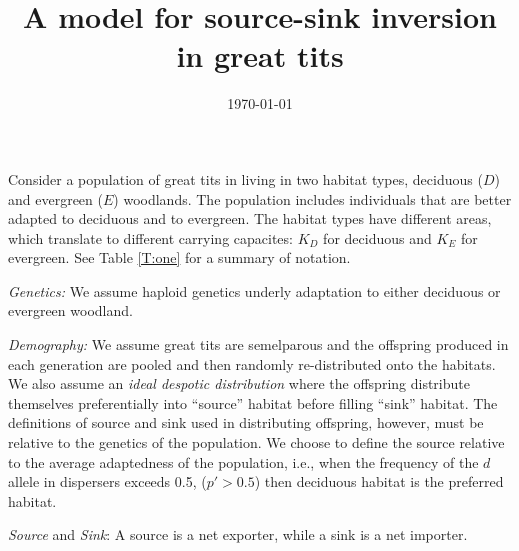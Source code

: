 \documentclass[11pt, reqno]{amsart}
\title{A model for source-sink inversion in great tits}
\author{}
\date{\today}
\begin{document}
\maketitle

Consider a population of great tits in living in two habitat types, deciduous ($D$) and evergreen ($E$) woodlands. 
The population includes individuals that are better adapted to deciduous and to evergreen. 
The habitat types have different areas, which translate to different carrying capacites: $K_D$ for  deciduous and $K_E$ for evergreen.
See Table \ref{T:one} for a summary of notation.

{\em Genetics:} We assume haploid genetics underly adaptation to either deciduous or evergreen woodland. 

{\em Demography:} We assume great tits are semelparous and the offspring produced in each generation are pooled and then randomly re-distributed onto the habitats. 
We also assume an {\em ideal despotic distribution} where the offspring distribute themselves preferentially into ``source'' habitat before filling ``sink'' habitat. 
The definitions of source and sink used in distributing offspring, however, must be relative to the genetics of the population. 
We choose to define the source relative to the average adaptedness of the population, i.e., when the frequency of the $d$ allele in dispersers exceeds 0.5, ($p' > 0.5$) then deciduous habitat is the preferred habitat.

{\em Source} and {\em Sink}: A source is a net exporter, while a sink is a net importer. 
\end{document}
